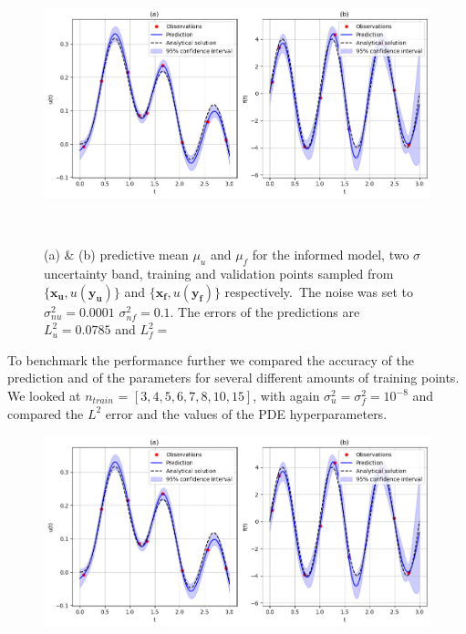 \documentclass{article}
\begin{document}
\begin{figure}[htbp!]
    \centering
    \includegraphics[width=1\textwidth]{../final_examples/oscillator/oscillator_noise.png}
    \caption{(a) \& (b) predictive mean $\mu_u$ and $\mu_f$ for the informed model, two $\sigma$ uncertainty band, training and validation points sampled from $\{\bm{x_u},u(\bm{y_u})\}$ and $\{\bm{x_f},u(\bm{y_f})\}$ respectively.\ The noise was set to $\sigma_{nu}^2 = 0.0001$  $\sigma_{nf}^2 = 0.1$. The errors of the predictions are $L^2_u = 0.0785 $ and $L^2_f = $}
    ~\label{fig:damped_oscillator_with_noise}
\end{figure}
To benchmark the performance further we compared the accuracy of the prediction and of the parameters for several different amounts of training points. We looked at $n_{train}$ = $\left[3,4,5,6,7,8,10,15\right]$, with again $\sigma^2_u = \sigma^2_f = 10^{-8}$ and compared the $L^2$ error and the values of the PDE hyperparameters. 
\begin{figure}[htbp!]
    \centering
    \includegraphics[width=1\textwidth]{../final_examples/oscillator/oscillator_noise.png}
    \caption{}
    ~\label{fig:damped_oscillator_with_noise}
\end{figure}
\end{document}

